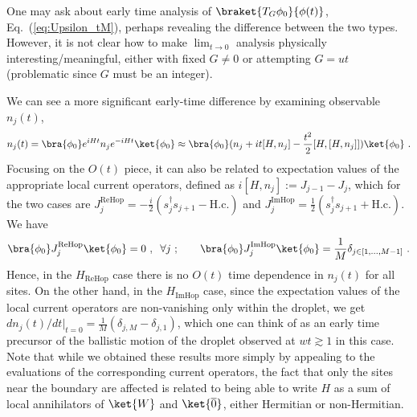 \documentclass[prx,letterpaper,aps,superscriptaddress,floatfix,twocolumn,nofootinbib]{revtex4-2}
\theoremstyle{definition}
\newcommand{\defn}{:=}
\newcommand{\ktO}{\ket{\overline{0}}}
\newcommand{\ktW}{\ket{W}}
\begin{document}
%
One may ask about early time analysis of $\braket{T_G\phi_0}{\phi(t)}$, Eq.~(\ref{eq:Upsilon_tM}), perhaps revealing the difference between the two types.
%
However, it is not clear how to make $\lim_{t\to 0}$ analysis physically interesting/meaningful, either with fixed $G \neq 0$ or attempting $G = ut$ (problematic since $G$ must be an integer).
%

%
We can see a more significant early-time difference by examining observable $n_j(t)$,
\begin{equation}
n_j(t) = \bra{\phi_0} e^{iHt} n_j e^{-iHt} \ket{\phi_0} \approx \bra{\phi_0} (n_j + it[H, n_j] - \frac{t^2}{2}[H, [H, n_j]]) \ket{\phi_0} ~. 
\end{equation}
%
Focusing on the $O(t)$ piece, it can also be related to expectation values of the appropriate local current operators, defined as $i[H, n_j] \defn J_{j-1} - J_j$, which for the two cases are $J_j^{\text{ReHop}} = -\frac{i}{2} (s_j^\dagger s_{j+1} - \text{H.c.})$ and $J_j^{\text{ImHop}} = \frac{1}{2} (s_j^\dagger s_{j+1} + \text{H.c.})$.
%
We have
\begin{equation}
\bra{\phi_0} J_j^{\text{ReHop}} \ket{\phi_0} = 0~, \;\; \forall j~; \qquad
\bra{\phi_0} J_j^{\text{ImHop}} \ket{\phi_0} = \frac{1}{M} \delta_{j \in [1, \dots, M-1]} ~. 
\end{equation}
%
Hence, in the $H_{\text{ReHop}}$ case there is no $O(t)$ time dependence in $n_j(t)$ for all sites.
%
On the other hand, in the $H_{\text{ImHop}}$ case, since the expectation values of the local current operators are non-vanishing only within the droplet, we get $dn_j(t)/dt|_{t=0} = \frac{1}{M} (\delta_{j,M} -\delta_{j,1})$, which one can think of as an early time precursor of the ballistic motion of the droplet observed at $w t \gtrsim 1$ in this case.
%
Note that while we obtained these results more simply by appealing to the evaluations of the corresponding current operators, the fact that only the sites near the boundary are affected is related to being able to write $H$ as a sum of local annihilators of $\ktW$ and $\ktO$, either Hermitian or non-Hermitian. 
%

%
\end{document}
